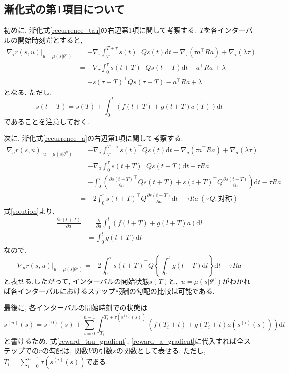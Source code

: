 \documentclass{jsarticle}
\newcommand{\pdif}[2]{\frac{\partial#1}{\partial#2}}
\begin{document}
{\subsection{漸化式の第1項目について}
初めに, 漸化式\eqref{recurrence_tau}の右辺第1項に関して考察する.~$T$を各インターバルの開始時刻だとすると, 
\begin{align}
	\nabla_{\tau}r(s, u)|_{u=\mu(s|\theta^{\mu})} &= -\nabla_{\tau}\int_{T}^{T+\tau} s(t)^{\top}Qs(t)\textrm{d}t - \nabla_{\tau}(\tau a^{\top}Ra) + \nabla_{\tau}(\lambda\tau) \nonumber\\
	&= -\nabla_{\tau}\int_{0}^{\tau} s(t+T)^{\top}Qs(t+T)\textrm{d}t - a^{\top}Ra + \lambda \nonumber\\
	&= - s(\tau+T)^{\top}Qs(\tau+T) - a^{\top}Ra + \lambda \label{reward_tau_gradient}
\end{align}
となる. ただし, 
\begin{equation}
	s(t+T) = s(T) + \int_{0}^{t} (f(l+T)+g(l+T)a(T))\textrm{d}l \label{solution}
\end{equation}
であることを注意しておく.
\par
次に, 漸化式\eqref{recurrence_a}の右辺第1項に関して考察する. 
\begin{align}
	\nabla_{a}r(s, u)|_{u=\mu(s|\theta^{\mu})} &= -\nabla_{a}\int_{T}^{T+\tau} s(t)^{\top}Qs(t)\textrm{d}t - \nabla_{a}(\tau a^{\top}Ra) + \nabla_{a}(\lambda\tau) \nonumber\\
	&= -\nabla_{a}\int_{0}^{\tau} s(t+T)^{\top}Qs(t+T)\textrm{d}t - \tau Ra \nonumber\\
	&= -\int_{0}^{\tau} (\pdif{s(t+T)}{a}^{\top}Qs(t+T)+s(t+T)^{\top}Q\pdif{s(t+T)}{a})\textrm{d}t - \tau Ra \nonumber \\
	&= -2\int_{0}^{\tau} s(t+T)^{\top}Q\pdif{s(t+T)}{a}\textrm{d}t - \tau Ra~(∵Q:対称)
\end{align}
式\eqref{solution}より, 
\begin{align}
	\pdif{s(t+T)}{a} &= \pdif{}{a}\int_{0}^{t} (f(l+T)+g(l+T)a)\textrm{d}l \nonumber \\
	&= \int_{0}^{t} g(l+T)\textrm{d}l
\end{align}
なので, 
\begin{equation}
	\nabla_{a}r(s, u)|_{u=\mu(s|\theta^{\mu})} = -2\int_{0}^{\tau}s(t+T)^{\top}Q\left\{\int_{0}^{t}g(l+T)\textrm{d}l\right\}\textrm{d}t - \tau Ra \label{reward_a_gradient}
\end{equation}
と表せる.したがって, インターバルの開始状態$s(T)$と,~$u=\mu(s|\theta^{\mu})$がわかれば各インターバルにおけるステップ報酬の勾配の比較は可能である.\par
最後に, 各インターバルの開始時刻での状態は
\begin{equation}
	s^{(n)}(s) = s^{(0)}(s) + \sum_{i=0}^{n−1}\int_{T_i}^{T_i + \tau(s^{(i)}(s))}(f(T_i+t)+g(T_i+t)a(s^{(i)}(s)))\textrm{d}t
\end{equation}
と書けるため, 式\eqref{reward_tau_gradient}, \eqref{reward_a_gradient}に代入すれば全ステップでの$r$の勾配は, 関数$V$の引数$s$の関数として表せる. ただし,~$T_i = \sum_{i=0}^{n-1}\tau(s^{(i)}(s))$である. 


}
\end{document}
